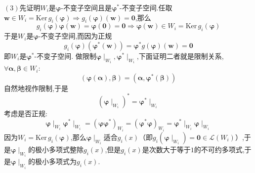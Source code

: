 \begin{formal}
\begin{Proof}
        $(3)$先证明$W_i$是$\bm{\varphi}$-不变子空间且是$\bm{\varphi}^*$-不变子空间.任取$\bm{w}\in W_i=\mathrm{Ker}\,g_i\left(\bm{\varphi}\right)\Longrightarrow g_i\left(\bm{\varphi}\right)\left(\bm{w}\right)=\bm{0}$,那么\[
        g_i\left(
            \bm{\varphi}
        \right)\bm{\varphi}\left(\bm{w}\right)=\bm{\varphi}\left(\bm{0}\right)=\bm{0}\Longrightarrow\bm{\varphi}\left(\bm{w}\right)\in W_i=\mathrm{Ker}\,g_i\left(\bm{\varphi}\right)
        \]于是$W_i$是$\bm{\varphi}$-不变子空间,而因为正规\[
        g_i\left(\bm{\varphi}\right)\left(
            \bm{\varphi}^*\left(\bm{w}\right)
        \right)=\bm{\varphi}^*g\left(
            \bm{\varphi}
        \right)\left(\bm{w}\right)=\bm{0}
        \]即$W_i$是$\bm{\varphi}^*$-不变子空间.
        做限制$\bm{\varphi}\mid_{W_i},\bm{\varphi}^*\mid_{W_i}$,下面证明二者就是限制关系,$\forall\bm{\alpha},\bm{\beta}\in W_i:$\[
        \left(
            \bm{\varphi}\left(
                \bm{\alpha}
            \right),\bm{\beta}
        \right)=\left(
            \bm{\alpha},\bm{\varphi}^*\left(
                \bm{\beta}
            \right)
        \right)
        \]自然地视作限制,于是\[
        \left(
            \bm{\varphi}\mid_{W_i}
        \right)^*=\bm{\varphi}^*\mid_{W_i}
        \]考虑是否正规:\[
        \bm{\varphi}\mid_{W_i}\bm{\varphi}^*\mid_{W_i}=\left(
            \bm{\varphi}\bm{\varphi}^*
        \right)_{W_i}=\left(
            \bm{\varphi}^*\bm{\varphi}
        \right)_{W_i}=\bm{\varphi}^*\mid_{W_i}\bm{\varphi}\mid_{W_i}
        \]因为$W_i=\mathrm{Ker}\,g_i\left(\bm{\varphi}\right)$,那么$\bm{\varphi}\mid_{W_i}$适合$g_i\left(x\right)$（即$g_i\left(\bm{\varphi}\mid_{W_i}\right)=\bm{0}\in\mathcal{L}\left(W_i\right)$）,于是$\bm{\varphi}\mid_{W_i}$的极小多项式整除$g_i\left(x\right)$,但是$g_i\left(x\right)$是次数大于等于$1$的不可约多项式,于是$\bm{\varphi}\mid_{W_i}$的极小多项式为$g_i\left(x\right)$.
    \end{Proof}
\end{formal}

